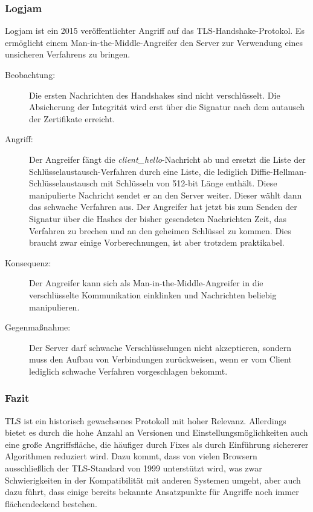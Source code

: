 \subsubsection{Logjam}
Logjam\cite{Adrian2015} ist ein 2015 veröffentlichter Angriff auf das
TLS-Handshake-Protokol. Es ermöglicht einem Man-in-the-Middle-Angreifer
den Server zur Verwendung eines unsicheren Verfahrens zu bringen.
\begin{description}
\item[Beobachtung:] 
  Die ersten Nachrichten des Handshakes sind nicht verschlüsselt. Die
  Absicherung der Integrität wird erst über die Signatur nach dem
  autausch der Zertifikate erreicht.
\item[Angriff:] Der Angreifer fängt die \emph{client\_hello}-Nachricht ab
  und ersetzt die Liste der Schlüsselaustausch-Verfahren durch eine
  Liste, die lediglich Diffie-Hellman-Schlüsselaustausch mit Schlüsseln
  von 512-bit Länge enthält. Diese manipulierte Nachricht sendet er an
  den Server weiter. Dieser wählt dann das schwache Verfahren aus.
  Der Angreifer hat jetzt bis zum Senden der Signatur über die Hashes
  der bisher gesendeten Nachrichten Zeit, das Verfahren zu brechen und
  an den geheimen Schlüssel zu kommen. Dies braucht zwar einige
  Vorberechnungen, ist aber trotzdem praktikabel.
\item[Konsequenz:] Der Angreifer kann sich als
  Man-in-the-Middle-Angreifer in die verschlüsselte Kommunikation
  einklinken und Nachrichten beliebig manipulieren.
\item[Gegenmaßnahme:] Der Server darf schwache Verschlüsselungen nicht
  akzeptieren, sondern muss den Aufbau von Verbindungen zurückweisen,
  wenn er vom Client lediglich schwache Verfahren vorgeschlagen bekommt.
\end{description}

\subsubsection{Fazit}
TLS ist ein historisch gewachsenes Protokoll mit hoher Relevanz. Allerdings bietet es durch die hohe Anzahl an Versionen und
Einstellungsmöglichkeiten auch eine große Angriffsfläche, die häufiger durch Fixes als durch Einführung sichererer Algorithmen reduziert
wird. Dazu kommt, dass von vielen Browsern ausschließlich der TLS-Standard von 1999 unterstützt wird, was zwar Schwierigkeiten in der
Kompatibilität mit anderen Systemen umgeht, aber auch dazu führt, dass einige bereits bekannte Ansatzpunkte für Angriffe
noch immer flächendeckend bestehen.

